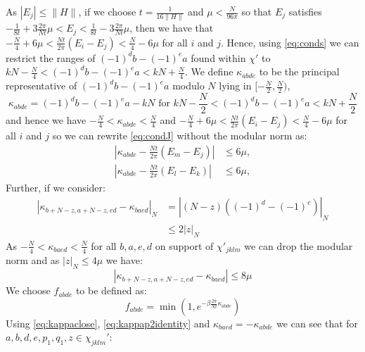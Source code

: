 As $|E_j| \leq \|H\|$, if we choose $t = \frac{1}{16\|H\|}$ and $\mu < \frac{N}{96\pi}$ so that $E_j$ satisfies $-\frac{1}{8t} + 3\frac{2\pi}{Nt}\mu < E_j < \frac{1}{8t} - 3\frac{2\pi}{Nt}\mu$, then we have that $-\frac{N}{4}+6\mu < \frac{Nt}{2\pi}(E_i -E_j) < \frac{N}{4}-6\mu$ for all $i$ and $j$. Hence, using \eqref{eq:conds} we can restrict the ranges of $(-1)^db-(-1)^ea$ found within $\chi'$ to $kN - \frac{N}{4}< (-1)^db-(-1)^ea < kN + \frac{N}{4}$.
We define $\kappa_{abde}$ to be the principal representative of $(-1)^db-(-1)^ea$ modulo $N$ lying in $[-\frac{N}{2},\frac{N}{2})$, 
\begin{equation}
    \kappa_{abde} = (-1)^db-(-1)^ea-kN \text{ for } kN - \frac{N}{2}< (-1)^db-(-1)^ea < kN + \frac{N}{2}
    \label{eq:kappadef}
\end{equation}
and hence we have $-\frac{N}{4}<\kappa_{abde} < \frac{N}{4}$ and $-\frac{N}{4}+6\mu < \frac{Nt}{2\pi}(E_i -E_j) < \frac{N}{4}-6\mu$ for all $i$ and $j$ so we can rewrite \eqref{eq:condJ} without the modular norm as:
\begin{equation}
    \begin{aligned}
    \left|\kappa_{abde}-\frac{Nt}{2\pi}(E_m-E_j)\right|&\leq 6\mu,\\
    \left|\kappa_{abde}-\frac{Nt}{2\pi}(E_l-E_k)\right|&\leq 6\mu,
\end{aligned}
\label{eq:kappaclose}
\end{equation}
Further, if we consider:
\begin{align}
    \left|\kappa_{b+N-z,a+N-z,ed} - \kappa_{baed}\right|_{N} &= |(N-z)((-1)^d-(-1)^e)|_{N}\\
    &\leq 2|z|_{N}
\end{align}
As $-\frac{N}{4}<\kappa_{baed} < \frac{N}{4}$ for all $b,a,e,d$ on support of $\chi'_{jklm}$ we can drop the modular norm and as $|z|_{N} \leq 4\mu$ we have:
\begin{equation}
    \left|\kappa_{b+N-z,a+N-z,ed} - \kappa_{baed}\right| \leq 8\mu
    \label{eq:kappap2identity}
\end{equation}
We choose $f_{abde}$ to be defined as:
\begin{equation}
    f_{abde} = \min(1,e^{-\beta\frac{2\pi}{Nt}\kappa_{abde}})
\end{equation}
Using \eqref{eq:kappaclose}, \eqref{eq:kappap2identity} and $\kappa_{baed}
= -\kappa_{abde}$ we can see that for $a,b,d,e,p_1,q_1,z \in \chi_{jklm}'$:
